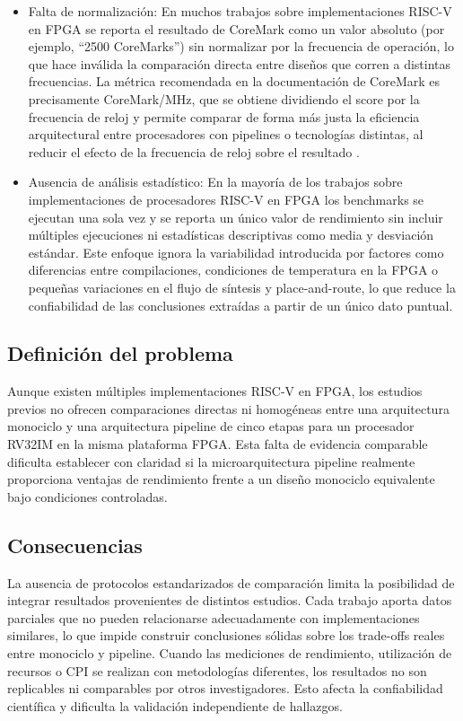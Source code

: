 \begin{enumerate}
\begin{itemize}
                    \item Falta de normalización: En muchos trabajos sobre implementaciones RISC-V en FPGA se reporta el resultado de CoreMark como un valor absoluto (por ejemplo, “2500 CoreMarks”) sin normalizar por la frecuencia de operación, lo que hace inválida la comparación directa entre diseños que corren a distintas frecuencias. La métrica recomendada en la documentación de CoreMark es precisamente CoreMark/MHz, que se obtiene dividiendo el score por la frecuencia de reloj y permite comparar de forma más justa la eficiencia arquitectural entre procesadores con pipelines o tecnologías distintas, al reducir el efecto de la frecuencia de reloj sobre el resultado \parencite{EEMBC2009CoreMark,arm2022coremark,analog2023coremark}.

                    \item Ausencia de análisis estadístico: En la mayoría de los trabajos sobre implementaciones de procesadores RISC-V en FPGA los benchmarks se ejecutan una sola vez y se reporta un único valor de rendimiento sin incluir múltiples ejecuciones ni estadísticas descriptivas como media y desviación estándar. Este enfoque ignora la variabilidad introducida por factores como diferencias entre compilaciones, condiciones de temperatura en la FPGA o pequeñas variaciones en el flujo de síntesis y place-and-route, lo que reduce la confiabilidad de las conclusiones extraídas a partir de un único dato puntual.
                \end{itemize}

\end{enumerate}


\subsection{Definición del problema }

Aunque existen múltiples implementaciones RISC-V en FPGA, los estudios previos no ofrecen comparaciones directas ni homogéneas entre una arquitectura monociclo y una arquitectura pipeline de cinco etapas para un procesador RV32IM en la misma plataforma FPGA. Esta falta de evidencia comparable dificulta establecer con claridad si la microarquitectura pipeline realmente proporciona ventajas de rendimiento frente a un diseño monociclo equivalente bajo condiciones controladas.

\subsection{Consecuencias}
La ausencia de protocolos estandarizados de comparación limita la posibilidad de integrar resultados provenientes de distintos estudios. Cada trabajo aporta datos parciales que no pueden relacionarse adecuadamente con implementaciones similares, lo que impide construir conclusiones sólidas sobre los trade-offs reales entre monociclo y pipeline.
Cuando las mediciones de rendimiento, utilización de recursos o CPI se realizan con metodologías diferentes, los resultados no son replicables ni comparables por otros investigadores. Esto afecta la confiabilidad científica y dificulta la validación independiente de hallazgos.

